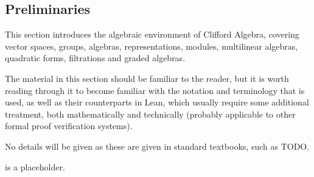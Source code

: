 \subsection{Preliminaries}

This section introduces the algebraic environment of Clifford Algebra,
covering vector spaces, groups, algebras, representations, modules, multilinear algebras,
quadratic forms, filtrations and graded algebras.

The material in this section should be familiar to the reader, but it is worth reading
 through it to become familiar with the notation and terminology that is used,
 as well as their counterparts in Lean, which usually require some additional treatment, both
 mathematically and technically (probably applicable to other formal proof verification systems).

No details will be given as these are given in standard textbooks, such as TODO.

\begin{definition}[Placeholder]
    \label{placeholder}

     is a placeholder.

\end{definition}
